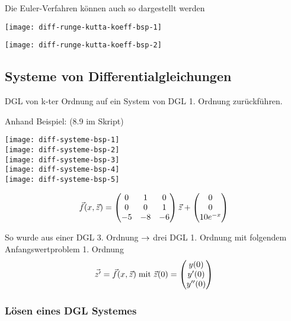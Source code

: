 Die Euler-Verfahren können auch so dargestellt werden

\begin{minipage}{0.35\linewidth}
	\texttt{[image: diff-runge-kutta-koeff-bsp-1]}
\end{minipage}
\hfill
\begin{minipage}{0.55\linewidth}
	\texttt{[image: diff-runge-kutta-koeff-bsp-2]}
\end{minipage}




\subsection{Systeme von Differentialgleichungen}

DGL von k-ter Ordnung auf ein System von DGL 1. Ordnung
zurückführen.


Anhand Beispiel: (8.9 im Skript)

\texttt{[image: diff-systeme-bsp-1]}\\
\texttt{[image: diff-systeme-bsp-2]}\\
\texttt{[image: diff-systeme-bsp-3]}\\
\texttt{[image: diff-systeme-bsp-4]}\\
\texttt{[image: diff-systeme-bsp-5]}

\begingroup
\large

$$ \vec f(x, \vec z) =
	\begin{pmatrix}
		0  & 1  & 0  \\
		0  & 0  & 1  \\
		-5 & -8 & -6
	\end{pmatrix} \vec z
	+ \begin{pmatrix} 0 \\ 0 \\ 10e^{-x} \end{pmatrix}
$$


So wurde aus einer DGL 3. Ordnung $\rightarrow$ drei DGL 1. Ordnung mit folgendem
Anfangswertproblem 1. Ordnung
$$\vec{z'} = \vec f(x, \vec z) \; \mathrm{mit} \; \vec z(0) =
	\begin{pmatrix} y(0) \\ y'(0) \\ y''(0) \end{pmatrix}
$$
\endgroup



\subsubsection{Lösen eines DGL Systemes}

